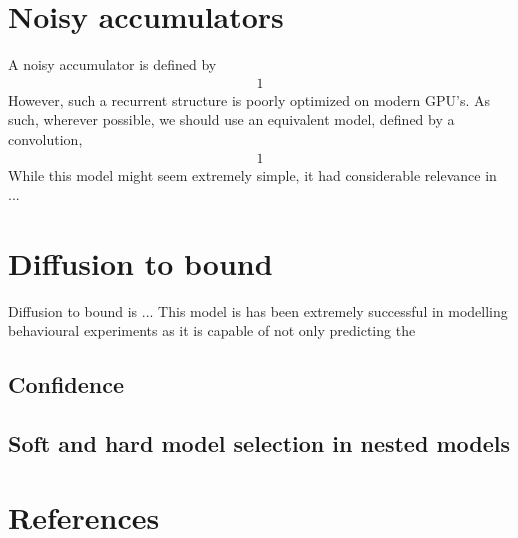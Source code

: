 \documentclass{article}
\begin{document}
\section{Noisy accumulators}

A noisy accumulator is defined by 
\begin{align}
  1
\end{align}
However, such a recurrent structure is poorly optimized on modern GPU's.
As such, wherever possible, we should use an equivalent model, defined by a convolution,
\begin{align}
  1
\end{align}
While this model might seem extremely simple, it had considerable relevance in ...

\section{Diffusion to bound}

Diffusion to bound is ...
This model is has been extremely successful in modelling behavioural experiments as it is capable of not only predicting the 

\subsection{Confidence}



\subsection{Soft and hard model selection in nested models}

\section*{References}
\end{document}
